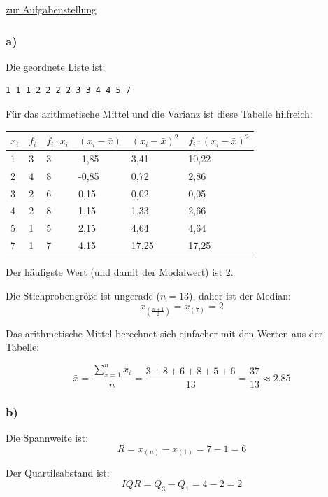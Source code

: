 \documentclass[
  11pt,
  ngerman,
  a4paper,
]{report}
\begin{document}
\protect\hyperlink{aufgabe-2-3}{zur Aufgabenstellung}

\hypertarget{a-4}{%
\subsubsection{a)}\label{a-4}}

Die geordnete Liste ist:

\begin{verbatim}
1 1 1 2 2 2 2 3 3 4 4 5 7
\end{verbatim}

Für das arithmetische Mittel und die Varianz ist diese Tabelle hilfreich:

\begin{table}[H]
\centering
\begin{tabular}{llllll}
\toprule
\textbf{$x_i$} & \textbf{$f_i$} & \textbf{$f_i\cdot x_i$} & \textbf{$(x_i-\bar{x})$} & \textbf{$(x_i-\bar{x})^2$} & \textbf{$f_i\cdot(x_i-\bar{x})^2$}\\
\midrule
1 & 3 & 3 & -1,85 & 3,41 & 10,22\\
2 & 4 & 8 & -0,85 & 0,72 & 2,86\\
3 & 2 & 6 & 0,15 & 0,02 & 0,05\\
4 & 2 & 8 & 1,15 & 1,33 & 2,66\\
5 & 1 & 5 & 2,15 & 4,64 & 4,64\\
7 & 1 & 7 & 4,15 & 17,25 & 17,25\\
\bottomrule
\end{tabular}
\end{table}

Der häufigste Wert (und damit der Modalwert) ist 2.

Die Stichprobengröße ist ungerade (\(n=13\)), daher ist der Median: \[x_{(\frac{n+1}{2})} = x_{(7)} = 2\]

Das arithmetische Mittel berechnet sich einfacher mit den Werten aus der Tabelle:

\[\bar{x}={\displaystyle\frac{\sum\limits_{x=1}^nx_i}{n}}=\frac{3+8+6+8+5+6}{13}=\frac{37}{13}\approx2.85\]

\hypertarget{b-4}{%
\subsubsection{b)}\label{b-4}}

Die Spannweite ist: \[R=x_{(n)}-x_{(1)}=7-1=6\]

Der Quartilsabstand ist: \[\mathit{IQR}=Q_3-Q_1=4-2=2\]
\end{document}
